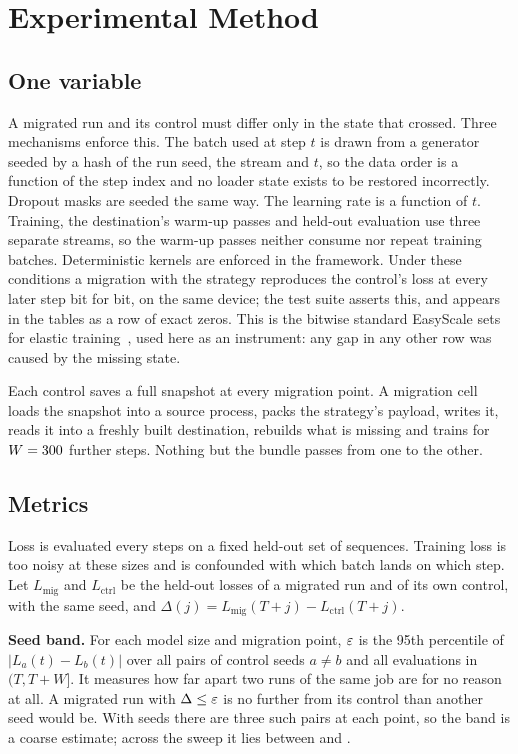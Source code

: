 \section{Experimental Method}
\label{sec:setup}

\subsection{One variable}
\label{sec:determinism}

A migrated run and its control must differ only in the state that crossed. Three mechanisms enforce this. The batch
used at step $t$ is drawn from a generator seeded by a hash of the run seed, the stream and $t$, so the data order is a
function of the step index and no loader state exists to be restored incorrectly. Dropout masks are seeded the same
way. The learning rate is a function of $t$. Training, the destination's warm-up passes and held-out evaluation use
three separate streams, so the warm-up passes neither consume nor repeat training batches. Deterministic kernels are
enforced in the framework. Under these conditions a migration with the  strategy reproduces the control's
loss at every later step bit for bit, on the same device; the test suite asserts this, and  appears in the
tables as a row of exact zeros. This is the bitwise standard EasyScale sets for elastic
training~\cite{li2023easyscale}, used here as an instrument: any gap in any other row was caused by the missing
state.

Each control saves a full snapshot at every migration point. A migration cell loads the snapshot into a source
process, packs the strategy's payload, writes it, reads it into a freshly built destination, rebuilds what is missing
and trains for $W = 300$ further steps. Nothing but the bundle passes from one to the other.

\subsection{Metrics}

Loss is evaluated every \evalEvery{} steps on a fixed held-out set of \evalSamples{} sequences. Training loss is too
noisy at these sizes and is confounded with which batch lands on which step. Let $L_{\mathrm{mig}}$ and
$L_{\mathrm{ctrl}}$ be the held-out losses of a migrated run and of its own control, with the same seed, and
$\Delta(j) = L_{\mathrm{mig}}(T+j) - L_{\mathrm{ctrl}}(T+j)$.

\textbf{Seed band.} For each model size and migration point, $\varepsilon$ is the 95th percentile of
$|L_a(t) - L_b(t)|$ over all pairs of control seeds $a \ne b$ and all evaluations in $(T, T+W]$. It measures how far
apart two runs of the same job are for no reason at all. A migrated run with $\Delta \le \varepsilon$ is no further from its
control than another seed would be. With \nSeedsMax{} seeds there are three such pairs at each point, so the band is
a coarse estimate; across the sweep it lies between \epsMin{} and \epsMax\mnats.

